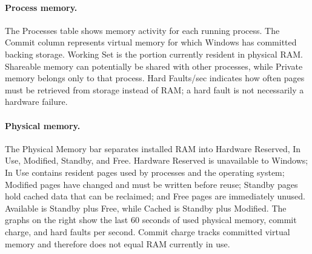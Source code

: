 
\paragraph{Process memory.}
The Processes table shows memory activity for each running process. The Commit
column represents virtual memory for which Windows has committed backing
storage. Working Set is the portion currently resident in physical RAM.
Shareable memory can potentially be shared with other processes, while Private
memory belongs only to that process. Hard Faults/sec indicates how often pages
must be retrieved from storage instead of RAM; a hard fault is not necessarily
a hardware failure.

\paragraph{Physical memory.}
The Physical Memory bar separates installed RAM into Hardware Reserved, In Use,
Modified, Standby, and Free. Hardware Reserved is unavailable to Windows; In Use
contains resident pages used by processes and the operating system; Modified
pages have changed and must be written before reuse; Standby pages hold cached
data that can be reclaimed; and Free pages are immediately unused. Available is
Standby plus Free, while Cached is Standby plus Modified. The graphs on the
right show the last 60 seconds of used physical memory, commit charge, and hard
faults per second. Commit charge tracks committed virtual memory and therefore
does not equal RAM currently in use.
